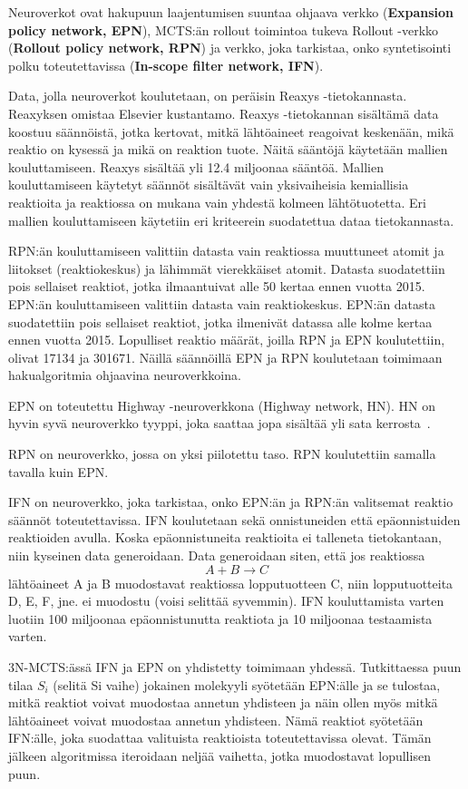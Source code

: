 \documentclass[finnish,twoside,censored,subject,sw-line]{HYthesisML}
\begin{document}
Neuroverkot ovat hakupuun laajentumisen suuntaa ohjaava verkko (\textbf{Expansion policy network, EPN}),
MCTS:än rollout toimintoa tukeva Rollout -verkko (\textbf{Rollout policy network, RPN})
ja verkko, joka tarkistaa, onko syntetisointi polku toteutettavissa (\textbf{In-scope filter network, IFN}).

Data, jolla neuroverkot koulutetaan, on peräisin Reaxys -tietokannasta. Reaxyksen omistaa Elsevier kustantamo. Reaxys -tietokannan sisältämä data koostuu
säännöistä, jotka kertovat, mitkä lähtöaineet reagoivat keskenään, mikä reaktio on kysessä ja mikä on reaktion
tuote. Näitä sääntöjä käytetään mallien kouluttamiseen. Reaxys sisältää yli 12.4 miljoonaa sääntöä. Mallien
kouluttamiseen käytetyt säännöt sisältävät vain yksivaiheisia kemiallisia reaktioita ja reaktiossa on mukana vain
yhdestä kolmeen lähtötuotetta. Eri mallien kouluttamiseen käytetiin eri kriteerein suodatettua dataa tietokannasta.

RPN:än kouluttamiseen valittiin datasta vain reaktiossa muuttuneet atomit ja liitokset (reaktiokeskus)
ja lähimmät vierekkäiset atomit. Datasta suodatettiin pois sellaiset reaktiot, jotka ilmaantuivat
alle 50 kertaa ennen vuotta 2015. EPN:än kouluttamiseen valittiin datasta vain reaktiokeskus.
EPN:än datasta suodatettiin pois sellaiset reaktiot, jotka ilmenivät datassa alle kolme kertaa ennen vuotta
2015. Lopulliset reaktio määrät, joilla RPN ja EPN koulutettiin, olivat 17134 ja 301671. Näillä säännöillä
EPN ja RPN koulutetaan toimimaan hakualgoritmia ohjaavina neuroverkkoina.

EPN on toteutettu Highway -neuroverkkona (Highway network, HN). HN on hyvin syvä neuroverkko
tyyppi, joka saattaa jopa sisältää yli sata kerrosta~\cite{VeryDeepNetworks}.

RPN on neuroverkko, jossa on yksi piilotettu taso. RPN koulutettiin samalla tavalla kuin EPN.

IFN on neuroverkko, joka tarkistaa, onko EPN:än ja RPN:än valitsemat reaktio säännöt toteutettavissa.
IFN koulutetaan sekä onnistuneiden että epäonnistuiden reaktioiden avulla. Koska epäonnistuneita
reaktioita ei talleneta tietokantaan, niin kyseinen data generoidaan. Data generoidaan siten, että jos reaktiossa
\[A + B \rightarrow C\] lähtöaineet A ja B muodostavat reaktiossa lopputuotteen C, niin lopputuotteita
D, E, F, jne. ei muodostu (voisi selittää syvemmin). IFN kouluttamista varten luotiin 100 miljoonaa
epäonnistunutta reaktiota ja 10 miljoonaa testaamista varten.

3N-MCTS:ässä IFN ja EPN on yhdistetty toimimaan yhdessä. Tutkittaessa puun tilaa $S_i$ (selitä Si vaihe) jokainen
molekyyli syötetään EPN:älle ja se tulostaa, mitkä reaktiot voivat muodostaa annetun yhdisteen ja näin ollen
myös mitkä lähtöaineet voivat muodostaa annetun yhdisteen. Nämä reaktiot syötetään IFN:älle, joka suodattaa
valituista reaktioista toteutettavissa olevat. Tämän jälkeen algoritmissa iteroidaan neljää vaihetta, jotka
muodostavat lopullisen puun.
\end{document}
